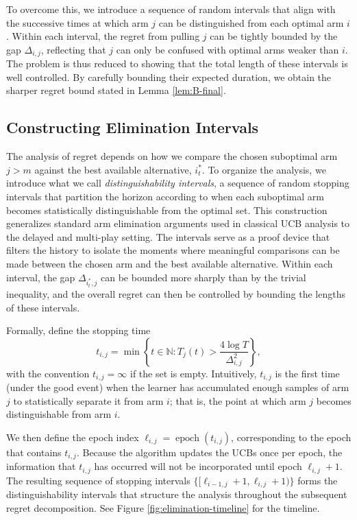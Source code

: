 \documentclass[opre,blindrev]{informs3}
\newcommand{\epoch}{\operatorname{epoch}}
\begin{document}
\begin{APPENDICES}
To overcome this, we introduce a sequence of random intervals that align with the successive times at which arm \(j\) can be distinguished from each optimal arm \(i\). Within each interval, the regret from pulling \(j\) can be tightly bounded by the gap \(\Delta_{i,j}\), reflecting that \(j\) can only be confused with optimal arms weaker than \(i\). The problem is thus reduced to showing that the total length of these intervals is well controlled. By carefully bounding their expected duration, we obtain the sharper regret bound stated in Lemma \ref{lem:B-final}.


\subsection{Constructing Elimination Intervals}
The analysis of regret depends on how we compare the chosen suboptimal arm \(j>m\) against the best available alternative, $i_t^*$. To organize the analysis, we introduce what we call \emph{distinguishability intervals}, a sequence of random stopping intervals that partition the horizon according to when each suboptimal arm becomes statistically distinguishable from the optimal set. This construction generalizes standard arm elimination arguments used in classical UCB analysis to the delayed and multi-play setting. The intervals serve as a proof device that filters the history to isolate the moments where meaningful comparisons can be made between the chosen arm and the best available alternative. Within each interval, the gap \(\Delta_{i^*_t,j}\) can be bounded more sharply than by the trivial inequality, and the overall regret can then be controlled by bounding the lengths of these intervals.

Formally, define the stopping time
\[
t_{i,j} = \min\left\{t\in \mathbb{N} : T_j(t) > \frac{4\log T}{\Delta^2_{i,j}}\right\},
\]
with the convention \(t_{i,j}=\infty\) if the set is empty. Intuitively, \(t_{i,j}\) is the first time (under the good event) when the learner has accumulated enough samples of arm \(j\) to statistically separate it from arm \(i\); that is, the point at which arm \(j\) becomes distinguishable from arm \(i\). 

We then define the epoch index $\ell_{i,j} = \epoch(t_{i,j})$,
corresponding to the epoch that contains \(t_{i,j}\). Because the algorithm updates the UCBs once per epoch, the information that \(t_{i,j}\) has occurred will not be incorporated until epoch \(\ell_{i,j} + 1\). The resulting sequence of stopping intervals
\(\{[\ell_{i-1,j}+1, \ell_{i,j}+1)\}\)
forms the distinguishability intervals that structure the analysis throughout the subsequent regret decomposition. See Figure \ref{fig:elimination-timeline} for the timeline.


\end{APPENDICES}
\end{document}
